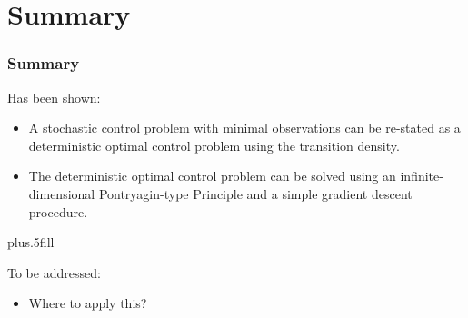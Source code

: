 \documentclass{beamer}
\begin{document}
\section*{Summary}

\begin{frame}
\frametitle<presentation>{Summary}
\begin{block}{Has been shown:}
  \begin{itemize}
    \item A stochastic control problem with minimal observations can be re-stated as a
deterministic optimal control problem using the transition density. 

	\item The deterministic optimal control problem can be solved using an
infinite-dimensional Pontryagin-type Principle and a simple gradient descent
procedure.
  \end{itemize}
\end{block}

\vskip0pt plus.5fill

\begin{block}{To be addressed:}
  \begin{itemize}
    \item Where to apply this?
  \end{itemize}
\end{block}

\end{frame}
\end{document}
